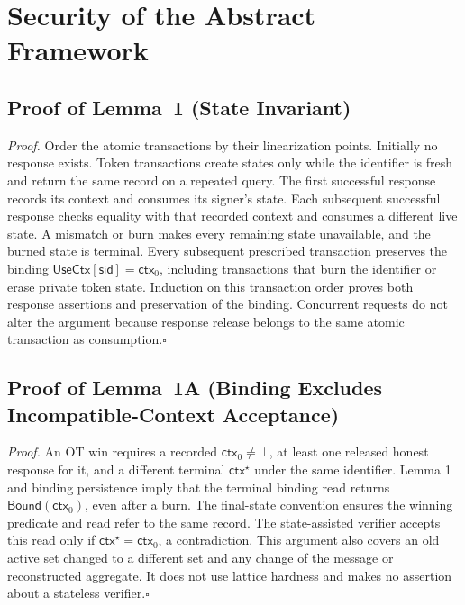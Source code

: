 \documentclass[lettersize,journal]{IEEEtran}
\begin{document}
	\section{Security of the Abstract Framework}
	
	\subsection{Proof of Lemma~1 (State Invariant)}
	\label{app:proof-state-invariant}
	
	\emph{Proof.}
	Order the atomic transactions by their linearization points. Initially no
	response exists. Token transactions create states only while the identifier
	is fresh and return the same record on a repeated query. The first
	successful response records its context and consumes its signer's state.
	Each subsequent successful response checks equality with that recorded
	context and consumes a different live state. A mismatch or burn makes every
	remaining state unavailable, and the burned state is terminal. Every subsequent
	prescribed transaction preserves the binding
	$\mathsf{UseCtx}[\mathsf{sid}]=\mathsf{ctx}_0$, including transactions
	that burn the identifier or erase private token state.
	Induction on this transaction order proves both response assertions
	and preservation of the binding. Concurrent requests do not
	alter the argument because response release belongs to the same atomic
	transaction as consumption.\hfill$\square$
	
	\subsection{Proof of Lemma~1A (Binding Excludes Incompatible-Context Acceptance)}
	\label{app:proof-context-binding}
	
	\emph{Proof.}
	An OT win requires a recorded $\mathsf{ctx}_0\ne\bot$, at least one released
	honest response for it, and a different terminal $\mathsf{ctx}^{\star}$
	under the same identifier. Lemma 1 and binding persistence imply that the
	terminal binding read returns $\mathsf{Bound}(\mathsf{ctx}_0)$, even after
	a burn. The final-state convention ensures the winning predicate and read
	refer to the same record. The state-assisted verifier accepts this read only if
	$\mathsf{ctx}^{\star}=\mathsf{ctx}_0$, a contradiction. This argument also
	covers an old active set changed to a different set and any change of the
	message or reconstructed aggregate. It does not use lattice hardness and
	makes no assertion about a stateless verifier.\hfill$\square$
	
\end{document}

